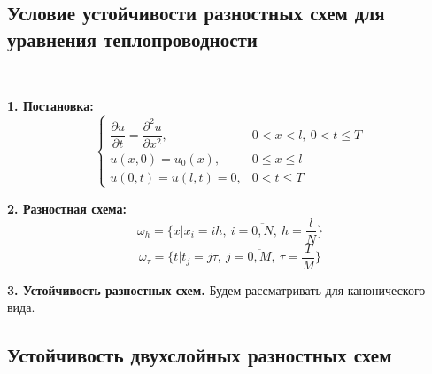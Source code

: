 \documentclass[9pt]{article}
\begin{document}
\subsection{Условие устойчивости разностных схем для уравнения теплопроводности}

\ 
\par\textbf{1. Постановка:}
\[\left\{\begin{array}{ll}
    \dfrac{\partial u}{\partial t}=\dfrac{\partial^2u}{\partial x^2}, & 0<x<l,\ 0<t\le T \\
    u(x,0)=u_0(x), & 0\le x\le l \\
    u(0,t)=u(l,t)=0, & 0<t\le T
\end{array}\right.\]
\par\textbf{2. Разностная схема:}
\[\omega_h=\{x|x_i=ih,\ i = \overline{0,N},\ h = \frac{l}{N}\}\]
\[\omega_\tau=\{t|t_j=j\tau,\ j=\overline{0,M},\ \tau=\frac{T}{M}\}\]
\par\textbf{3. Устойчивость разностных схем.} Будем рассматривать для канонического вида.

\subsection{Устойчивость двухслойных разностных схем}
\end{document}
